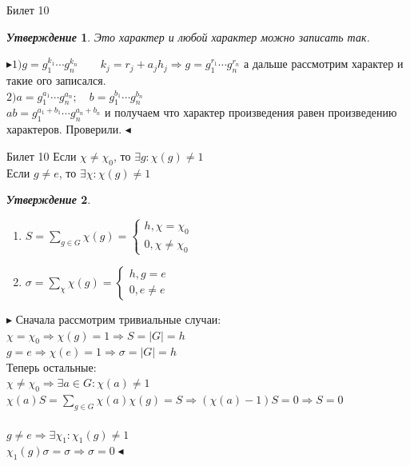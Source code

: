 \documentclass[a4paper,12pt]{article}
\newtheorem{utv}{\textit{Утверждение}}
\newcommand{\q}{\quad}
\newcommand{\pb}{\blacktriangleright}
\newcommand{\pe}{\blacktriangleleft}
\newcommand{\Ra}{\Rightarrow}
\newcommand{\SL}{\sum\limits}
\begin{document}
\begin{mybox2}{\hypertarget{bil10}{Билет 10}}
\begin{formbox}{}
\begin{utv} Это характер и любой характер можно записать так.
\end{utv}
\end{formbox}
$\pb 1) g = g_1^{k_1}\cdots g_n^{k_n}\q\q k_j = r_j + a_jh_j\Ra g = g_1^{r_1}\cdots g_n^{r_n} $ а дальше рассмотрим характер и такие ого записался.\\
$2) a = g_1^{a_1}\cdots g_n^{a_n};\q b = g_1^{b_1}\cdots g_n^{b_n}$\\
$ab = g_1^{a_1 + b_1}\cdots g_n^{a_n + b_n}$ и получаем что характер произведения равен произведению характеров. Проверили. $\pe$
\end{mybox2}
\newpage
\begin{mybox2}{{Билет 10}}
Если $\chi \not=\chi_0$, то $\exists g: \chi(g) \not=1$\\
Если $g\not=e$, то $\exists \chi: \chi(g)\not=1$

\begin{formbox}{}
\begin{utv}\q\\
\begin{enumerate}
\item $S = \SL_{g\in G}\chi(g) = \begin{cases}h, \chi = \chi_0\\ 0, \chi \not= \chi_0\end{cases}$
\item $\sigma = \SL_{\chi}\chi(g) = \begin{cases}h, g = e\\ 0, e \not= e\end{cases}$
\end{enumerate}
\end{utv}
\end{formbox}
$\pb$ Сначала рассмотрим тривиальные случаи:\\
$\chi = \chi_0\Ra\chi(g) = 1\Ra S = |G| = h$\\
$g = e\Ra \chi(e) = 1\Ra\sigma = |G| = h$\\
Теперь остальные:\\
$\chi \not=\chi_0 \Ra \exists a\in G: \chi(a)\not=1$\\
$\chi(a)S = \SL_{g\in G}\chi(a)\chi(g) = S\Ra (\chi(a) - 1) S = 0 \Ra S = 0$\\\q\\
$g\not=e\Ra\exists \chi_1:\chi_1(g)\not=1$\\
$\chi_1(g)\sigma = \sigma \Ra \sigma = 0 \pe$


\end{mybox2}
\end{document}
